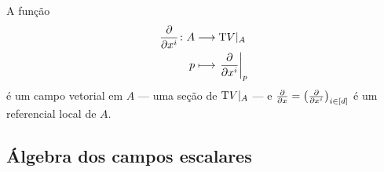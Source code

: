 A função
\begin{align*}
	{\frac{\partial{}}{\partial{x^i}}}\colon {A} &\longrightarrow {\mathrm{T}V|_A} \\{p} &\longmapsto \left.{\frac{\partial{}}{\partial{x^i}}}\right|_p
\end{align*}
é um campo vetorial em $A$ --- uma seção de $\mathrm{T} V|_A$ --- e $\frac{\partial{}}{\partial{x}} = \left( \frac{\partial{}}{\partial{x^i}} \right)_{i \in [d]}$ é um referencial local de $A$.
















\subsection{Álgebra dos campos escalares}

